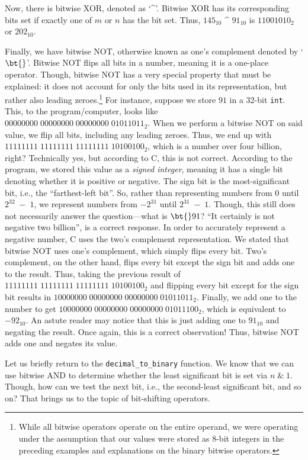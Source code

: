 Now, there is bitwise XOR, denoted as `\^{}'. Bitwise XOR has its corresponding bits set if exactly one of $m$ or $n$ has the bit set. Thus, $145_{10}$ \^{} $91_{10}$ is $11001010_2$ or $202_{10}$.

Finally, we have bitwise NOT, otherwise known as one's complement denoted by `$\bt{}$'. Bitwise NOT flips all bits in a number, meaning it is a one-place operator. Though, bitwise NOT has a very special property that must be explained: it does not account for only the bits used in its representation, but rather also leading zeroes.\footnote{While all bitwise operators operate on the entire operand, we were operating under the assumption that our values were stored as 8-bit integers in the preceding examples and explanations on the binary bitwise operators.} For instance, suppose we store $91$ in a 32-bit \texttt{int}. This, to the program/computer, looks like $00000000\;00000000\;00000000\;01011011_{2}$. When we perform a bitwise NOT on said value, we flip all bits, including any leading zeroes. Thus, we end up with $11111111\;11111111\;11111111\;10100100_{2}$, which is a number over four billion, right? Technically yes, but according to C, this is not correct. According to the program, we stored this value as a \textit{signed integer}, meaning it has a single bit denoting whether it is positive or negative. The sign bit is the most-significant bit, i.e., the ``farthest-left bit''. So, rather than representing numbers from 0 until $2^{32}\;-\;1$, we represent numbers from $-2^{31}$ until $2^{31}\;-\;1$. Though, this still does not necessarily answer the question—what is $\bt{}91$? ``It certainly is not negative two billion'', is a correct response. In order to accurately represent a negative number, C uses the two's complement representation. We stated that bitwise NOT uses one's complement, which simply flips every bit. Two's complement, on the other hand, flips every bit except the sign bit and adds one to the result. Thus, taking the previous result of $11111111\;11111111\;11111111\;10100100_{2}$ and flipping every bit except for the sign bit results in $10000000\;00000000\;00000000\;01011011_{2}$. Finally, we add one to the number to get $10000000\;00000000\;00000000\;01011100_{2}$, which is equivalent to $-92_{10}$. An astute reader may notice that this is just adding one to $91_{10}$ and negating the result. Once again, this is a correct observation! Thus, bitwise NOT adds one and negates its value.

Let us briefly return to the \texttt{decimal\_to\_binary} function. We know that we can use bitwise AND to determine whether the least significant bit is set via $n\;\&\;1$. Though, how can we test the next bit, i.e., the second-least significant bit, and so on? That brings us to the topic of bit-shifting operators.


